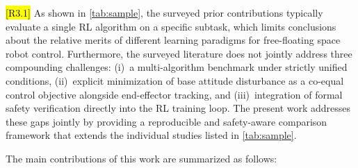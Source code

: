 \documentclass{ieeeaccess}
\newcommand{\hlthree}[1]{{\sethlcolor{rthree}\hl{#1}}}
\newenvironment{rthreehl}
  {\def\FrameCommand{\colorbox{rthree}}\MakeFramed{\advance\hsize-\width\FrameRestore}}
  {\endMakeFramed}
\begin{document}
\begin{rthreehl}
\hlthree{[R3.1]} As shown in \autoref{tab:sample}, the surveyed prior contributions typically evaluate a single RL algorithm on a specific subtask, which limits conclusions about the relative merits of different learning paradigms for free-floating space robot control. Furthermore, the surveyed literature does not jointly address three compounding challenges: (i)~a multi-algorithm benchmark under strictly unified conditions, (ii)~explicit minimization of base attitude disturbance as a co-equal control objective alongside end-effector tracking, and (iii)~integration of formal safety verification directly into the RL training loop. The present work addresses these gaps jointly by providing a reproducible and safety-aware comparison framework that extends the individual studies listed in \autoref{tab:sample}.
\end{rthreehl}

The main contributions of this work are summarized as follows:
\end{document}
